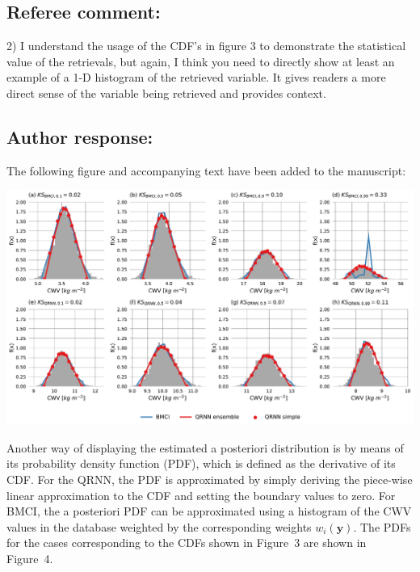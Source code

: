 \documentclass[journal abbreviation, manuscript]{copernicus}
\begin{document}
\subsection*{Referee comment:}

2) I understand the usage of the CDF’s in figure 3 to demonstrate the statistical value of
the retrievals, but again, I think you need to directly show at least an example of a 1-D
histogram of the retrieved variable. It gives readers a more direct sense of the variable
being retrieved and provides context.

\subsection*{Author response:}

The following figure and accompanying text have been added to the manuscript:

    \begin{center}
    \includegraphics[width = 1.0\linewidth]{../plots/fig04}
    \end{center}

\begin{em}
  Another way of displaying the estimated a posteriori distribution is by means
  of its probability density function (PDF), which is defined as the derivative
  of its CDF. For the QRNN, the PDF is approximated by simply deriving
  the piece-wise linear approximation to the CDF and setting the boundary values
  to zero. For BMCI, the a posteriori PDF can be approximated using a histogram
  of the CWV values in the database weighted by the corresponding weights
  $w_i(\mathbf{y})$. The PDFs for the cases corresponding to the CDFs shown in
  Figure~3 are shown in Figure~4.
\end{em}
\end{document}
